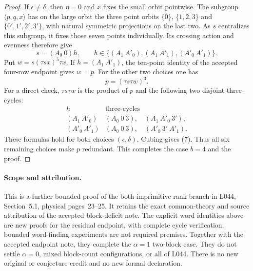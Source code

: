\documentclass[11pt,a4paper]{article}
\newcommand{\gen}[1]{\langle#1\rangle}
\begin{document}
\begin{proof}
If $\epsilon\ne\delta$, then $\eta=0$ and $x$ fixes the
small orbit pointwise. The subgroup $\gen{p,q,x}$ has on the
large orbit the three point orbits $\{0\}$, $\{1,2,3\}$ and
$\{0',1',2',3'\}$, with natural symmetric projections on the
last two. As $s$ centralizes this subgroup, it fixes those
seven points individually. Its crossing action and evenness
therefore give
\[
 s=(A_0\ 0)h,\qquad
 h\in\{(A_1\ A'_0),(A_1\ A'_1),(A'_0\ A'_1)\}.           \tag{6}
\]
Put $w=s(\tau s x)^5\tau x$. If $h=(A_1\ A'_1)$, the
ten-point identity of the accepted four-row endpoint gives
$w=p$. For the other two choices one has
\[
                         p=(\tau s\tau w)^3.              \tag{7}
\]
For a direct check, $\tau s\tau w$ is the product of $p$
and the following two disjoint three-cycles:
\[
\begin{array}{c|l}
h&\text{three-cycles}\\\hline
(A_1\ A'_0)&(A_0\ 0\ 3),\quad(A_1\ A'_0\ 3'),\\
(A'_0\ A'_1)&(A_0\ 0\ 3),\quad(A'_0\ 3'\ A'_1).
\end{array}
\]
These formulas hold for both choices $(\epsilon,\delta)$.
Cubing gives (7). Thus all six remaining choices make $p$
redundant. This completes the case $b=4$ and the proof.
\end{proof}

\paragraph{Scope and attribution.}
This is a further bounded proof of the both-imprimitive rank
branch in L044, Section~5.1, physical pages~23--25. It retains
the exact common-theory and source attribution of the accepted
block-deficit note. The explicit word identities above are
new proofs for the residual endpoint, with complete cycle
verification; bounded word-finding experiments are not
required premises. Together with the accepted endpoint note,
they complete the $\alpha=1$ two-block case. They do not
settle $\alpha=0$, mixed block-count configurations, or all of
L044. There is no new original or conjecture credit and no
new formal declaration.
\end{document}
